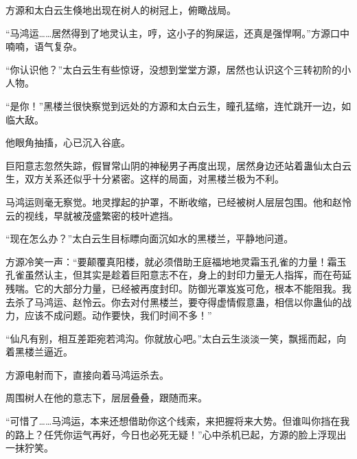 \begin{this_body}
方源和太白云生倏地出现在树人的树冠上，俯瞰战局。

“马鸿运……居然得到了地灵认主，哼，这小子的狗屎运，还真是强悍啊。”方源口中喃喃，语气复杂。

“你认识他？”太白云生有些惊讶，没想到堂堂方源，居然也认识这个三转初阶的小人物。

“是你！”黑楼兰很快察觉到远处的方源和太白云生，瞳孔猛缩，连忙跳开一边，如临大敌。

他眼角抽搐，心已沉入谷底。

巨阳意志忽然失踪，假冒常山阴的神秘男子再度出现，居然身边还站着蛊仙太白云生，双方关系还似乎十分紧密。这样的局面，对黑楼兰极为不利。

马鸿运则毫无察觉。地灵撑起的护罩，不断收缩，已经被树人层层包围。他和赵怜云的视线，早就被茂盛繁密的枝叶遮挡。

“现在怎么办？”太白云生目标瞟向面沉如水的黑楼兰，平静地问道。

方源冷笑一声：“要颠覆真阳楼，就必须借助王庭福地地灵霜玉孔雀的力量！霜玉孔雀虽然认主，但其实是趁着巨阳意志不在，身上的封印力量无人指挥，而在苟延残喘。它的大部分力量，已经被再度封印。防御光罩岌岌可危，根本不能阻我。我去杀了马鸿运、赵怜云。你去对付黑楼兰，要夺得虚情假意蛊，相信以你蛊仙的战力，应该不成问题。动作要快，我们时间不多！”

“仙凡有别，相互差距宛若鸿沟。你就放心吧。”太白云生淡淡一笑，飘摇而起，向着黑楼兰逼近。

方源电射而下，直接向着马鸿运杀去。

周围树人在他的意志下，层层叠叠，跟随而来。

“可惜了……马鸿运，本来还想借助你这个线索，来把握将来大势。但谁叫你挡在我的路上？任凭你运气再好，今日也必死无疑！”心中杀机已起，方源的脸上浮现出一抹狞笑。

\end{this_body}

